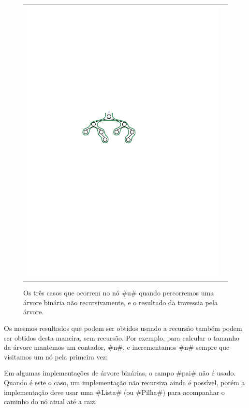 \begin{figure}
\begin{center}
\begin{tabular}{cc}
      \includegraphics[scale=0.90909]{figs/bintree-3}
    \end{tabular}
  \end{center}
  \caption[Percorrendo uma ArvoreBinaria]{Os três casos que ocorrem no nó
    #u# quando percorremos uma árvore binária não recursivamente, e o resultado da travessia pela árvore.}
\end{figure}

Os mesmos resultados que podem ser obtidos usando a recursão também podem ser obtidos desta maneira, sem recursão. Por exemplo, para calcular o tamanho 
da árvore mantemos um contador, #n#, e incrementamos #n# sempre que visitamos um nó pela primeira vez:

Em algumas implementações de árvore binárias, o campo #pai# não é usado.
Quando é este o caso, um implementação não recursiva ainda é possível,
porém a implementação deve usar uma #Lista# (ou #Pilha#) para acompanhar
o caminho do nó atual até a raiz.

